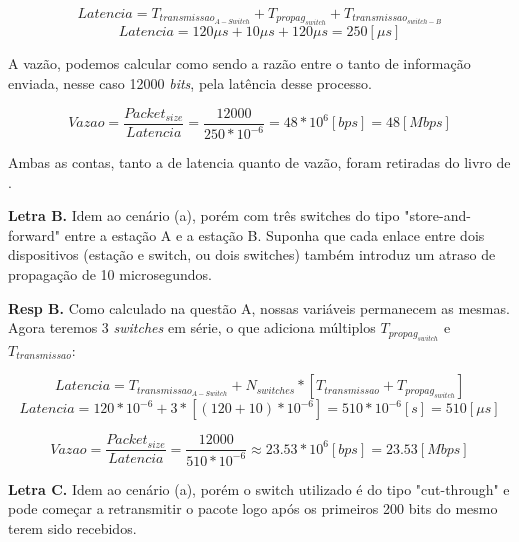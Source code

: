 \begin{equation}
	Latencia = T_{transmissao_{A-Switch}} + T_{propag_{switch}} + T_{transmissao_{switch-B}}
\end{equation} 
\begin{equation}
	Latencia = 120\mu s + 10\mu s + 120\mu s = 250 [\mu s]
\end{equation}

A vazão, podemos calcular como sendo a razão entre o tanto de informação enviada, nesse caso 12000 \textit{bits}, pela latência desse processo.

\begin{equation}
	Vazao = \frac{Packet_{size}}{Latencia} = \frac{12000}{250 * 10^{-6}} = 48 * 10^6 [bps] = 48 [Mbps]
\end{equation}

Ambas as contas, tanto a de latencia quanto de vazão, foram retiradas do livro de \textcite{peterson2025redes}.
\newline

    \textbf{Letra B.} Idem ao cenário (a), porém com três switches do tipo "store-and-forward" entre
    a estação A e a estação B. Suponha que cada enlace entre dois dispositivos (estação
    e switch, ou dois switches) também introduz um atraso de propagação de 10
    microsegundos.
    \newline

\textbf{Resp B.} Como calculado na questão A, nossas variáveis permanecem as mesmas. Agora teremos 3 \textit{switches} em série, o que adiciona múltiplos $T_{propag_{switch}}$ e $T_{transmissao}$:

\begin{equation}
	Latencia = T_{transmissao_{A-Switch}} + N_{switches}*[T_{transmissao} + T_{propag_{switch}}]
\end{equation}
\begin{equation}
	Latencia = 120*10^{-6} + 3*[(120 + 10)*10^{-6}] = 510 * 10^{-6} [s] = 510 [\mu s] 
\end{equation}

\begin{equation}
	Vazao = \frac{Packet_{size}}{Latencia} = \frac{12000}{510 * 10^{-6}} \approx 23.53 * 10^6 [bps] = 23.53 [Mbps]
\end{equation}
\newline

    \textbf{Letra C.} Idem ao cenário (a), porém o switch utilizado é do tipo "cut-through" e pode
    começar a retransmitir o pacote logo após os primeiros 200 bits do mesmo terem sido
    recebidos.
    \newline

